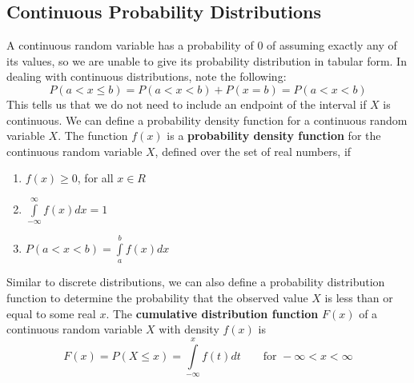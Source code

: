 \documentclass[11pt]{article}
\begin{document}
\subsection{Continuous Probability Distributions}
A continuous random variable has a probability of $0$ of assuming exactly any of its values, so we are unable to give its probability distribution in tabular form. In dealing with continuous distributions, note the following:
$$P(a<x\leq b) = P(a<x<b) + P(x=b) = P(a<x<b)$$
This tells us that we do not need to include an endpoint of the interval if $X$ is continuous. We can define a probability density function for a continuous random variable $X$. The function $f(x)$ is a \textbf{probability density function} for the continuous random variable $X$, defined over the set of real numbers, if
\begin{enumerate}
\item $f(x) \geq 0$, for all $x \in R$
\item $\int \limits_{-\infty}^{\infty} f(x) dx = 1$
\item $P(a<x<b) = \int \limits_{a}^{b} f(x) dx $
\end{enumerate}
Similar to discrete distributions, we can also define a probability distribution function to determine the probability that the observed value $X$ is less than or equal to some real $x$. The \textbf{cumulative distribution function} $F(x)$ of a continuous random variable $X$ with density $f(x)$ is 
$$ F(x) = P(X \leq x) = \int \limits_{-\infty}^{x} f(t) dt\quad \quad \text{for } -\infty < x < \infty $$
\end{document}
